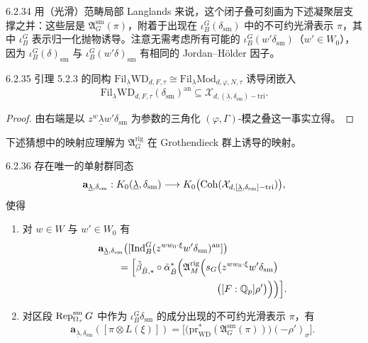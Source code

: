 \begin{rem}{6.2.34}\label{rem:a4-6-2-34}
用（光滑）范畴局部 Langlands 来说，这个闭子叠可刻画为下述凝聚层支撑之并：这些层是 $\mathfrak A_G^{\mathrm{sm}}(\pi)$，附着于出现在 $\iota_B^G(\delta_{\mathrm{sm}})$ 中的不可约光滑表示 $\pi$，其中 $\iota_B^G$ 表示归一化抛物诱导。注意无需考虑所有可能的 $\iota_B^G(w'\delta_{\mathrm{sm}})$（$w'\in W_0$），因为 $\iota_B^G(\delta)_{\mathrm{sm}}$ 与 $\iota_B^G(w'\delta)_{\mathrm{sm}}$ 有相同的 Jordan--Hölder 因子。
\end{rem}

\begin{lem}{6.2.35}\label{lem:a4-6-2-35}
引理 5.2.3 的同构 $\mathrm{Fil}_{\underline\lambda}\mathrm{WD}_{d,F,\tau}\cong\mathrm{Fil}_{\underline\lambda}\mathrm{Mod}_{d,\varphi,N,\tau}$ 诱导闭嵌入
\[
\mathrm{Fil}_{\underline\lambda}\mathrm{WD}_{d,F,\tau}(\delta_{\mathrm{sm}})^{\mathrm{an}}
\subseteq\mathcal X_{d,(\underline\lambda,\delta_{\mathrm{sm}})-\mathrm{tri}}.
\]
\end{lem}

\begin{proof}
由右端是以 $z^w\underline\lambda w'\delta_{\mathrm{sm}}$ 为参数的三角化 $(\varphi,\Gamma)$-模之叠这一事实立得。
\end{proof}

下述猜想中的映射应理解为 $\mathfrak A_G^{\mathrm{rig}}$ 在 Grothendieck 群上诱导的映射。

\begin{conj}{6.2.36}\label{conj:a4-6-2-36}
存在唯一的单射群同态
\[
\mathbf a_{\underline\lambda,\delta_{\mathrm{sm}}}:
K_0(\underline\lambda,\delta_{\mathrm{sm}})\longrightarrow
K_0\bigl(\operatorname{Coh}(\mathcal X_{d,[\underline\lambda,\delta_{\mathrm{sm}}]-\mathrm{tri}})\bigr),
\]
使得
\begin{enumerate}[label=(\roman*),leftmargin=2.2em,itemsep=0.2em]
\item 对 $w\in W$ 与 $w'\in W_0$ 有
\begin{align*}
&\mathbf a_{\underline\lambda,\delta_{\mathrm{sm}}}\bigl([\operatorname{Ind}_B^G(z^{ww_0\cdot\xi}w'\delta_{\mathrm{sm}})^{\mathrm{an}}]\bigr)\\
&\qquad=\Bigl[\tilde\beta_{\hat B,*}\circ\tilde\alpha_{\hat B}^{*}
\Bigl(\mathfrak A_M^{\mathrm{rig}}\Bigl(s_G\bigl(z^{ww_0\cdot\xi}w'\delta_{\mathrm{sm}}\bigr)\\
&\qquad\qquad\qquad\qquad\qquad\qquad
\bigl([F:\mathbb{Q}_p]\rho'\bigr)\Bigr)\Bigr)\Bigr].
\end{align*}
\item 对区段 $\operatorname{Rep}^{\mathrm{sm}}_{\Omega_\tau}G$ 中作为 $\iota_B^G\delta_{\mathrm{sm}}$ 的成分出现的不可约光滑表示 $\pi$，有
\[
\mathbf a_{\underline\lambda,\delta_{\mathrm{sm}}}([\pi\otimes L(\xi)])
=\bigl[\bigl(\mathrm{pr}_{\mathrm{WD}}^{*}(\mathfrak A_G^{\mathrm{sm}}(\pi))\bigr)(-\rho')_\sigma\bigr].
\]
\end{enumerate}
\end{conj}

